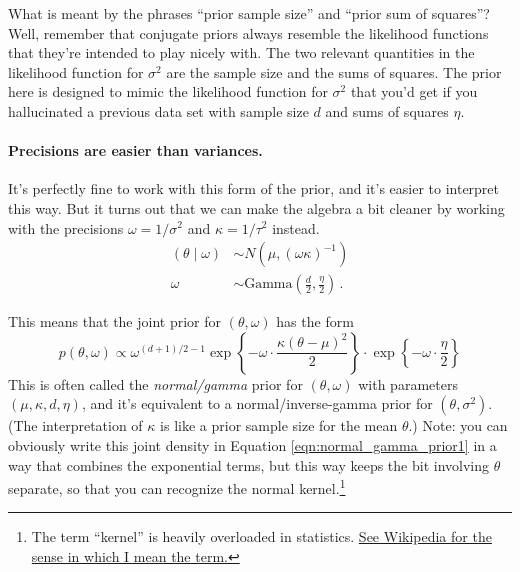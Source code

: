 \documentclass[11pt]{article}
\begin{document}
What is meant by the phrases ``prior sample size'' and ``prior sum of squares''?  Well, remember that conjugate priors always resemble the likelihood functions that they're intended to play nicely with.  The two relevant quantities in the likelihood function for $\sigma^2$ are the sample size and the sums of squares.  The prior here is designed to mimic the likelihood function for $\sigma^2$ that you'd get if you hallucinated a previous data set with sample size $d$ and sums of squares $\eta$.

\paragraph{Precisions are easier than variances.}  It's perfectly fine to work with this form of the prior, and it's easier to interpret this way.  But it turns out that we can make the algebra a bit cleaner by working with the precisions $\omega = 1/\sigma^2$ and $\kappa = 1/\tau^2$ instead.
\begin{align*}
(\theta \mid \omega) &\sim N(\mu, (\omega \kappa)^{-1}) \\
\omega &\sim \mbox{Gamma}\left( \frac{d}{2}, \frac{ \eta}{2} \right) \, .
\end{align*}

This means that the joint prior for $(\theta, \omega)$ has the form
\begin{equation}
\label{eqn:normal_gamma_prior1}
p(\theta, \omega) \propto \omega^{(d+1)/{2} - 1} \exp \left\{ - \omega \cdot \frac{\kappa (\theta - \mu)^2}{2}  \right\}
\cdot \exp\left\{ -  \omega \cdot \frac{\eta}{2}  \right\} 
\end{equation}
This is often called the \textit{normal/gamma} prior for $(\theta, \omega)$ with parameters $(\mu, \kappa, d, \eta)$, and it's equivalent to a normal/inverse-gamma prior for $(\theta, \sigma^2)$.  (The interpretation of $\kappa$ is like a prior sample size for the mean $\theta$.)  Note: you can obviously write this joint density in Equation \ref{eqn:normal_gamma_prior1} in a way that combines the exponential terms, but this way keeps the bit involving $\theta$ separate, so that you can recognize the normal kernel.\footnote{The term ``kernel'' is heavily overloaded in statistics. \href{http://en.wikipedia.org/wiki/Kernel_(statistics)\#In_Bayesian_statistics}{See Wikipedia for the sense in which I mean the term.}  }
\end{document}
